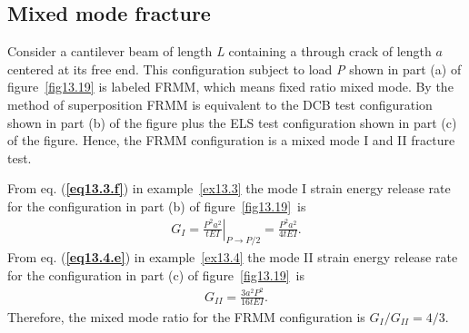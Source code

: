 \documentclass{AeroStructure-ERJohnson}
\begin{document}
\vspace*{-1pc}

\subsection{Mixed mode fracture}\label{sec13.7.1}

Consider a cantilever beam of length \textit{L} containing a through crack of length $a$ centered at its free end. This configuration subject to load \textit{P} shown in part (a) of figure~\ref{fig13.19} is labeled FRMM, which means fixed ratio mixed mode. By the method of superposition FRMM is equivalent to the DCB test configuration shown in part (b) of the figure plus the ELS test configuration shown in part (c) of the figure. Hence, the FRMM configuration is a mixed mode I and II fracture test.

\vspace*{-5pt}
\pagebreak

From eq. (\textbf{\ref{eq13.3.f}}) in example~\ref{ex13.3} the mode I strain energy release rate for the configuration in part (b) of figure~\ref{fig13.19}~is
\begin{align}\label{eq13.43}
G_{I}=\left.\frac{P^{2} a^{2}}{t E I}\right|_{P \rightarrow P / 2}=\frac{P^{2} a^{2}}{4 t E I}.
\end{align}
From eq. (\textbf{\ref{eq13.4.e}}) in example~\ref{ex13.4} the mode II strain energy release rate for the configuration in part (c) of figure~\ref{fig13.19}~is
\begin{align}\label{eq13.44}
G_{I I}=\frac{3 a^{2} P^{2}}{16 t E I}.
\end{align}
Therefore, the mixed mode ratio for the FRMM configuration is $G_{I}/G_{I I}=4/3$.
\end{document}
